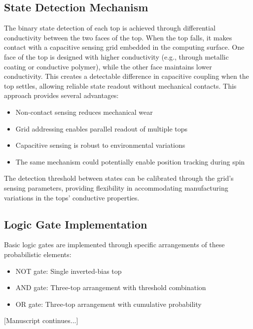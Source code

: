 \documentclass{article}
\begin{document}
\subsection{State Detection Mechanism}
The binary state detection of each top is achieved through differential conductivity between the two faces of the top. When the top falls, it makes contact with a capacitive sensing grid embedded in the computing surface. One face of the top is designed with higher conductivity (e.g., through metallic coating or conductive polymer), while the other face maintains lower conductivity. This creates a detectable difference in capacitive coupling when the top settles, allowing reliable state readout without mechanical contacts. This approach provides several advantages:
\begin{itemize}
    \item Non-contact sensing reduces mechanical wear
    \item Grid addressing enables parallel readout of multiple tops
    \item Capacitive sensing is robust to environmental variations
    \item The same mechanism could potentially enable position tracking during spin
\end{itemize}

The detection threshold between states can be calibrated through the grid's sensing parameters, providing flexibility in accommodating manufacturing variations in the tops' conductive properties.

\subsection{Logic Gate Implementation}
Basic logic gates are implemented through specific arrangements of these probabilistic elements:
\begin{itemize}
    \item NOT gate: Single inverted-bias top
    \item AND gate: Three-top arrangement with threshold combination
    \item OR gate: Three-top arrangement with cumulative probability
\end{itemize}

[Manuscript continues...]
\end{document}
